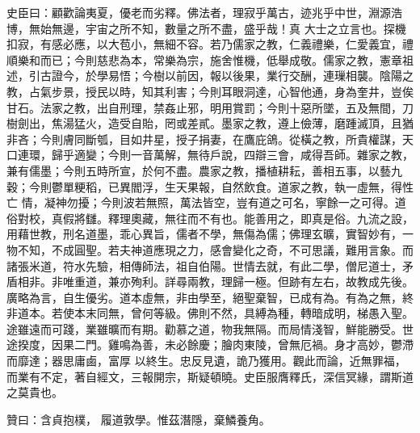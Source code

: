 \begin{pinyinscope}
 史臣曰：顧歡論夷夏，優老而劣釋。佛法者，理寂乎萬古，迹兆乎中世，淵源浩博，無始無邊，宇宙之所不知，數量之所不盡，盛乎哉！真
 大士之立言也。探機扣寂，有感必應，以大苞小，無細不容。若乃儒家之教，仁義禮樂，仁愛義宜，禮順樂和而已；今則慈悲為本，常樂為宗，施舍惟機，低舉成敬。儒家之教，憲章祖述，引古證今，於學易悟；今樹以前因，報以後果，業行交酬，連璅相襲。陰陽之教，占氣步景，授民以時，知其利害；今則耳眼洞達，心智他通，身為奎井，豈俟甘石。法家之教，出自刑理，禁姦止邪，明用賞罰；今則十惡所墜，五及無間，刀樹劍出，焦湯猛火，造受自貽，罔或差貳。墨家之教，遵上儉薄，磨踵滅頂，且猶非吝；今則膚同斷瓠，目如井星，授子捐妻，在鷹庇鴿。從橫之教，所貴權謀，天口連環，歸乎適變；今則一音萬解，無待戶說，四辯三會，咸得吾師。雜家之教，兼有儒墨；今則五時所宣，於何不盡。農家之教，播植耕耘，善相五事，以藝九穀；今則鬱單粳稻，已異閻浮，生天果報，自然飲食。道家之教，執一虛無，得性亡
 情，凝神勿擾；今則波若無照，萬法皆空，豈有道之可名，寧餘一之可得。道俗對校，真假將讎。釋理奧藏，無往而不有也。能善用之，即真是俗。九流之設，用藉世教，刑名道墨，乖心異旨，儒者不學，無傷為儒；佛理玄曠，實智妙有，一物不知，不成圓聖。若夫神道應現之力，感會變化之奇，不可思議，難用言象。而諸張米道，符水先驗，相傳師法，祖自伯陽。世情去就，有此二學，僧尼道士，矛盾相非。非唯重道，兼亦殉利。詳尋兩教，理歸一極。但跡有左右，故教成先後。廣略為言，自生優劣。道本虛無，非由學至，絕聖棄智，已成有為。有為之無，終非道本。若使本末同無，曾何等級。佛則不然，具縛為種，轉暗成明，梯愚入聖。途雖遠而可踐，業雖曠而有期。勸慕之道，物我無隔。而局情淺智，鮮能勝受。世途揆度，因果二門。雞鳴為善，未必餘慶；膾肉東陵，曾無厄禍。身才高妙，鬱滯而靡達；器思庸鹵，富厚
 以終生。忠反見遺，詭乃獲用。觀此而論，近無罪福，而業有不定，著自經文，三報開宗，斯疑頓曉。史臣服膺釋氏，深信冥緣，謂斯道之莫貴也。



 贊曰：含貞抱樸，
 履道敦學。惟茲潛隱，棄鱗養角。



\end{pinyinscope}